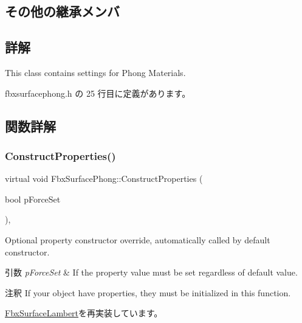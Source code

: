 \subsection*{その他の継承メンバ}


\subsection{詳解}
This class contains settings for Phong Materials. 

 fbxsurfacephong.\+h の 25 行目に定義があります。



\subsection{関数詳解}
\mbox{\label{class_fbx_surface_phong_aa4262a042d35769e8ff745d408315bf9}} 
\subsubsection{\texorpdfstring{Construct\+Properties()}{ConstructProperties()}}
{\footnotesize\ttfamily virtual void Fbx\+Surface\+Phong\+::\+Construct\+Properties (\begin{DoxyParamCaption}\item[{bool}]{p\+Force\+Set }\end{DoxyParamCaption})\hspace{0.3cm}{\ttfamily [protected]}, {\ttfamily [virtual]}}

Optional property constructor override, automatically called by default constructor. 
\begin{DoxyParams}{引数}
{\em p\+Force\+Set} & If the property value must be set regardless of default value. \\
\hline
\end{DoxyParams}
\begin{DoxyRemark}{注釈}
If your object have properties, they must be initialized in this function. 
\end{DoxyRemark}


\hyperlink{class_fbx_surface_lambert_a6693e1c08050978c78eece2aa48688e9}{Fbx\+Surface\+Lambert}を再実装しています。

\mbox{\label{class_fbx_surface_phong_af594d25056c03cd67396191c7d480098}} 
